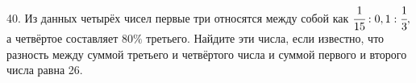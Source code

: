 40. Из данных четырёх чисел первые три относятся между собой как $\cfrac{1}{15}:0,1: \cfrac{1}{3},$ а четвёртое составляет $80\%$ третьего. Найдите эти числа, если известно, что разность между суммой третьего и четвёртого числа и суммой первого и второго числа равна 26.\\
